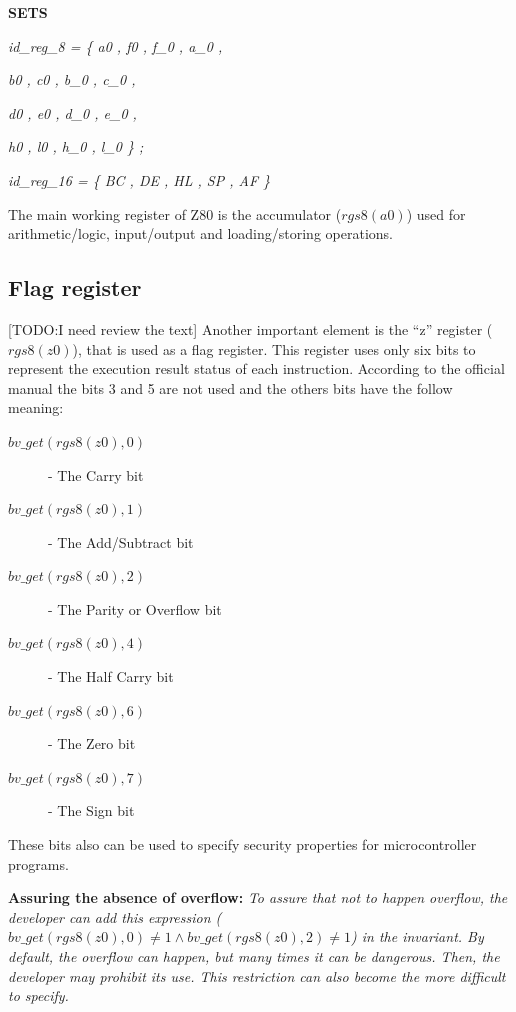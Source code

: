 \documentclass[11pt]{article} %
\begin{document}
\begin{sloppypar}
\bf SETS

\hspace*{0.10in}\it id\_reg\_8 \rm = \rm \{ \it a0 \rm , \it f0 \rm , \it f\_0 \rm , \it a\_0 \rm ,

\hspace*{1.0 in}\it b0 \rm , \it c0 \rm , \it b\_0 \rm , \it c\_0 \rm ,

\hspace*{1.00in}\it d0 \rm , \it e0 \rm , \it d\_0 \rm , \it e\_0 \rm ,

\hspace*{1.0in}\it h0 \rm , \it l0 \rm , \it h\_0 \rm , \it l\_0 \} ;

\hspace*{0.10in}\it id\_reg\_16 \rm = \rm \{ \it BC \rm , \it DE \rm , \it HL \rm , \it SP \rm , \it AF \rm \}
\end{sloppypar}

The main working register of Z80 is the accumulator ($\mathit{rgs8(a0)}$) used for arithmetic/logic,
input/output and loading/storing operations.

\subsection{Flag register} [TODO:I need review the text]
Another important element is the ``z'' register ($\mathit{rgs8(z0)}$),  that is used as a flag register. This
register uses only six bits to represent the execution result status of each instruction.
According to the official manual the bits 3 and 5 are not used and the others bits have the follow meaning:
\begin{description}
  \item[$\mathit{bv\_get(rgs8(z0),0)}$] - The Carry bit
  \item[$\mathit{bv\_get(rgs8(z0),1)}$] - The Add/Subtract bit
  \item[$\mathit{bv\_get(rgs8(z0),2)}$] - The Parity or Overflow bit
  \item[$\mathit{bv\_get(rgs8(z0),4)}$] - The Half Carry bit
  \item[$\mathit{bv\_get(rgs8(z0),6)}$] - The Zero bit
  \item[$\mathit{bv\_get(rgs8(z0),7)}$] - The Sign bit 
\end{description}

These bits also can be used to specify security properties for microcontroller programs.   

\textbf{Assuring the absence of overflow:}
 \emph{To assure that not to happen overflow, the developer can add this
 expression ($\mathit{bv\_get(rgs8(z0),0)} \neq 1 \land \mathit{bv\_get(rgs8(z0),2) \neq 1}$)
 in the invariant. By default, the overflow can happen, but many times it can be dangerous. 
 Then, the developer may prohibit its use. This restriction can also become the more difficult
 to specify.}
\end{document}
